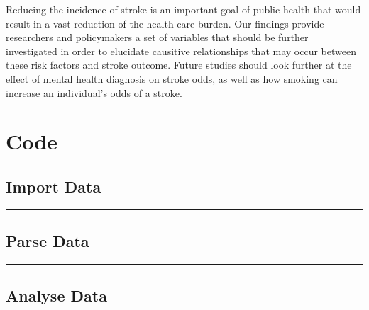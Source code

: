 \documentclass[11pt,]{article}
\begin{document}
Reducing the incidence of stroke is an important goal of public health
that would result in a vast reduction of the health care burden. Our
findings provide researchers and policymakers a set of variables that
should be further investigated in order to elucidate causitive
relationships that may occur between these risk factors and stroke
outcome. Future studies should look further at the effect of mental
health diagnosis on stroke odds, as well as how smoking can increase an
individual's odds of a stroke.




\newpage
\singlespacing 


\appendix
\singlespacing
\section{Code}
\fontsize{8}{12}\selectfont
\subsection{Import Data}

\rule{0.5\textwidth}{.4pt}
\subsection{Parse Data}

\rule{0.5\textwidth}{.4pt}
\subsection{Analyse Data}

\end{document}
